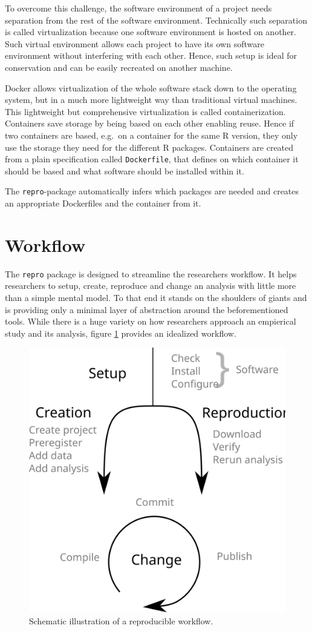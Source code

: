 \documentclass[12pt,a4paper,]{article}
\begin{document}
To overcome this challenge, the software environment of a project needs separation from the rest of the software environment. Technically such separation is called virtualization because one software environment is hosted on another. Such virtual environment allows each project to have its own software environment without interfering with each other. Hence, such setup is ideal for conservation and can be easily recreated on another machine.

Docker allows virtualization of the whole software stack down to the operating system, but in a much more lightweight way than traditional virtual machines. This lightweight but comprehensive virtualization is called containerization. Containers save storage by being based on each other enabling reuse. Hence if two containers are based, e.g.~on a container for the same R version, they only use the storage they need for the different R packages. Containers are created from a plain specification called \texttt{Dockerfile}, that defines on which container it should be based and what software should be installed within it.

The \texttt{repro}-package automatically infers which packages are needed and creates an appropriate Dockerfiles and the container from it.

\hypertarget{workflow}{%
\section{Workflow}\label{workflow}}

The \texttt{repro} package is designed to streamline the researchers workflow.
It helps researchers to setup, create, reproduce and change an analysis with little more than a simple mental model.
To that end it stands on the shoulders of giants and is providing only a minimal layer of abstraction around the beforementioned tools.
While there is a huge variety on how researchers approach an empierical study and its analysis, figure \ref{fig:workflow} provides an idealized workflow.

\begin{figure}

{\centering \includegraphics[width=0.5\linewidth]{images/idealized-workflow} 

}

\caption{Schematic illustration of a reproducible workflow.  }\label{fig:workflow}
\end{figure}
\end{document}
